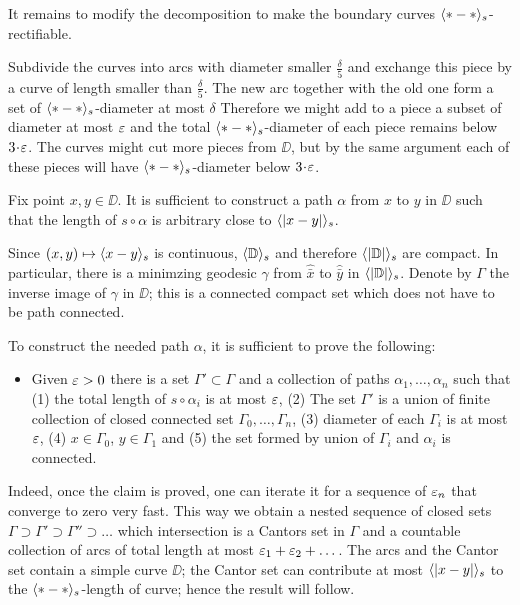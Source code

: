 It remains to modify the decomposition to make the boundary curves $\langle{*}-{*}\rangle_s$-rectifiable.

Subdivide the curves into arcs with diameter smaller $\tfrac{\delta}{5}$ and exchange this piece by a curve of length smaller than $\tfrac{\delta}{5}$.
The new arc together with the old one form a set of  $\langle{*}-{*}\rangle_s$-diameter at most $\delta$
Therefore we might add to a piece a subset of diameter at most $\varepsilon$ and the total $\langle{*}-{*}\rangle_s$-diameter of each piece remains below $3\cdot\eps$.
The curves might cut more pieces from $\DD$, but by the same argument each of these pieces will have $\langle{*}-{*}\rangle_s$-diameter below $3\cdot\eps$.
\qeds

Fix point $x,y\in \DD$.
It is sufficient to construct a path $\alpha$ from $x$ to $y$ in $\DD$ such that the length of $s\circ\alpha$ is arbitrary close to $\langle|x-y|\rangle_s$.

Since $(x,y)\mapsto \langle x-y\rangle_s$ is continuous, $\langle\mathbb{D}\rangle_s$ and therefore $\langle|\mathbb{D}|\rangle_s$ are compact.
In particular, there is a minimzing geodesic $\gamma$ from $\hat{\bar x}$ to $\hat{\bar y}$ in $\langle|\mathbb{D}|\rangle_s$.
Denote by $\Gamma$ the inverse image of $\gamma$ in $\DD$;
this is a connected compact set which does not have to be path connected.

To construct the needed path $\alpha$, it is sufficient to prove the following:

\begin{itemize}
 \item Given $\varepsilon>0$ there is a set $\Gamma'\subset \Gamma$ 
 and a collection of paths $\alpha_1,\dots,\alpha_n$ such that 
 (1) the total length of $s\circ\alpha_i$ is at most $\varepsilon$, 
 (2) The set $\Gamma'$ is a union of finite collection of closed connected set $\Gamma_0,\dots,\Gamma_n$, 
 (3) diameter of each $\Gamma_i$ is at most $\varepsilon$, 
 (4) $x\in\Gamma_0$, $y\in\Gamma_1$ and 
 (5) the set formed by union of $\Gamma_i$ and $\alpha_i$ is connected.
\end{itemize}

Indeed, once the claim is proved, one can iterate it for a sequence of $\varepsilon_n$ that converge to zero very fast. 
This way we obtain a nested sequence of closed sets $\Gamma\supset \Gamma'\supset\Gamma''\supset\dots$ which intersection is a Cantors set in $\Gamma$ and a countable collection of arcs of total length at most $\varepsilon_1+\varepsilon_2+\dots$.
The arcs and the Cantor set contain a simple curve $\DD$; the Cantor set can contribute at most $\langle|x-y|\rangle_s$ to the $\langle{*}-{*}\rangle_s$-length of curve; hence the result will follow.

